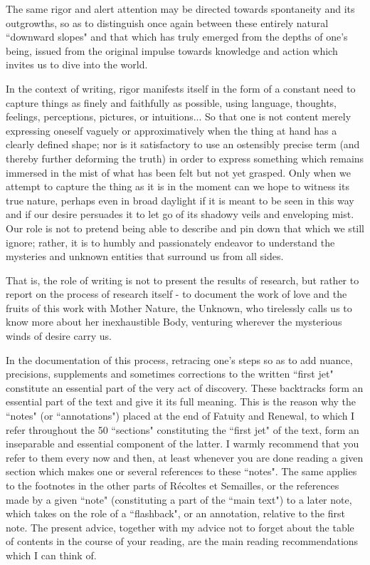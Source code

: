 The same rigor and alert attention may be directed towards spontaneity and its outgrowths, so as to distinguish once again between these entirely natural ``downward slopes" and that which has truly emerged from the depths of one's being, issued from the original impulse towards knowledge and action which invites us to dive into the world.

In the context of writing, rigor manifests itself in the form of a constant need to capture things as finely and faithfully as possible, using language, thoughts, feelings, perceptions, pictures, or intuitions... So that one is not content merely expressing oneself vaguely or approximatively when the thing at hand has a clearly defined shape; nor is it satisfactory to use an ostensibly precise term (and thereby further deforming the truth) in order to express something which remains immersed in the mist of what has been felt but not yet grasped. Only when we attempt to capture the thing as it is in the moment can we hope to witness its true nature, perhaps even in broad daylight if it is meant to be seen in this way and if our desire persuades it to let go of its shadowy veils and enveloping mist. Our role is not to pretend being able to describe and pin down that which we still ignore; rather, it is to humbly and passionately endeavor to understand the mysteries and unknown entities that surround us from all sides.

That is, the role of writing is not to present the results of research, but rather to report on the process of research itself - to document the work of love and the fruits of this work with Mother Nature, the Unknown, who tirelessly calls us to know more about her inexhaustible Body, venturing wherever the mysterious winds of desire carry us.

In the documentation of this process, retracing one's steps so as to add nuance, precisions, supplements and sometimes corrections to the written ``first jet" constitute an essential part of the very act of discovery. These backtracks form an essential part of the text and give it its full meaning. This is the reason why the ``notes" (or ``annotations") placed at the end of Fatuity and Renewal, to which I refer throughout the 50 ``sections" constituting the ``first jet" of the text, form an inseparable and essential component of the latter. I warmly recommend that you refer to them every now and then, at least whenever you are done reading a given section which makes one or several references to these ``notes". The same applies to the footnotes in the other parts of R\'ecoltes et Semailles, or the references made by a given ``note" (constituting a part of the ``main text") to a later note, which takes on the role of a ``flashback", or an annotation, relative to the first note. The present advice, together with my advice not to forget about the table of contents in the course of your reading, are the main reading recommendations which I can think of. 

